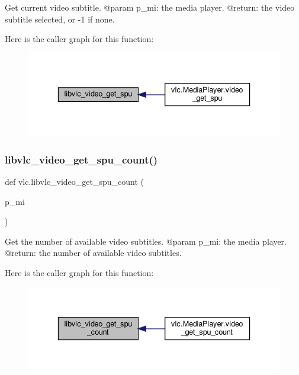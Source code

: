 \begin{DoxyVerb}Get current video subtitle.
@param p_mi: the media player.
@return: the video subtitle selected, or -1 if none.
\end{DoxyVerb}
 Here is the caller graph for this function\+:
\nopagebreak
\begin{figure}[H]
\begin{center}
\leavevmode
\includegraphics[width=336pt]{namespacevlc_ae6db3de1105a1c4365693745b2517c7d_icgraph}
\end{center}
\end{figure}
\mbox{\label{namespacevlc_aa022f0d518cb2fbf8f6601ee2489570a}} 
\subsubsection{\texorpdfstring{libvlc\+\_\+video\+\_\+get\+\_\+spu\+\_\+count()}{libvlc\_video\_get\_spu\_count()}}
{\footnotesize\ttfamily def vlc.\+libvlc\+\_\+video\+\_\+get\+\_\+spu\+\_\+count (\begin{DoxyParamCaption}\item[{}]{p\+\_\+mi }\end{DoxyParamCaption})}

\begin{DoxyVerb}Get the number of available video subtitles.
@param p_mi: the media player.
@return: the number of available video subtitles.
\end{DoxyVerb}
 Here is the caller graph for this function\+:
\nopagebreak
\begin{figure}[H]
\begin{center}
\leavevmode
\includegraphics[width=336pt]{namespacevlc_aa022f0d518cb2fbf8f6601ee2489570a_icgraph}
\end{center}
\end{figure}
\mbox{\label{namespacevlc_a1ea9c1d1ba99cac0cd71cb670c54d6f2}} 
